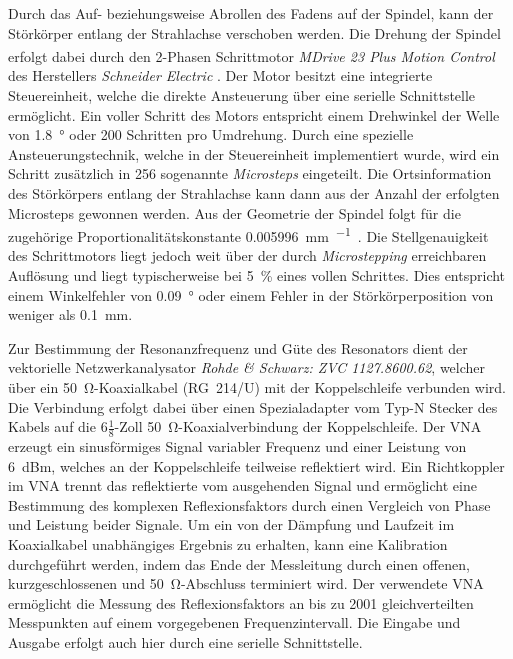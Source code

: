 Durch das Auf- beziehungsweise Abrollen des Fadens auf der Spindel, kann der Störkörper entlang der Strahlachse verschoben werden.
Die Drehung der Spindel erfolgt dabei durch den 2-Phasen Schrittmotor \textit{MDrive\textsuperscript{\textregistered} 23 Plus Motion Control} des Herstellers \textit{Schneider Electric} \cite{motor_datasheet}.
Der Motor besitzt eine integrierte Steuereinheit, welche die direkte Ansteuerung über eine serielle Schnittstelle ermöglicht.
Ein voller Schritt des Motors entspricht einem Drehwinkel der Welle von \SI{1.8}{\degree} oder \num{200} Schritten pro Umdrehung.
Durch eine spezielle Ansteuerungstechnik, welche in der Steuereinheit implementiert wurde, wird ein Schritt zusätzlich in \num{256} sogenannte \textit{Microsteps} eingeteilt.
Die Ortsinformation des Störkörpers entlang der Strahlachse kann dann aus der Anzahl der erfolgten Microsteps gewonnen werden.
Aus der Geometrie der Spindel folgt für die zugehörige Proportionalitätskonstante \SI{0.005996}{\milli\metre\per\micro\step}.
Die Stellgenauigkeit  des Schrittmotors liegt jedoch weit über der durch \textit{Microstepping} erreichbaren Auflösung und liegt typischerweise bei \SI{5}{\percent} eines vollen Schrittes.
Dies entspricht einem Winkelfehler von \SI{0.09}{\degree} oder einem Fehler in der Störkörperposition von weniger als \SI{0.1}{\milli\metre}.

Zur Bestimmung der Resonanzfrequenz und Güte des Resonators dient der vektorielle Netzwerkanalysator \textit{Rohde \& Schwarz: ZVC 1127.8600.62}, welcher über ein \SI{50}{\ohm}-Koaxialkabel (RG~214/U) mit der Koppelschleife verbunden wird.
Die Verbindung erfolgt dabei über einen Spezialadapter vom Typ-N Stecker des Kabels auf die $6\tfrac{1}{8}$-Zoll \SI{50}{\ohm}-Koaxialverbindung der Koppelschleife.
Der VNA erzeugt ein sinusförmiges Signal variabler Frequenz und einer Leistung von \SI{6}{dBm}, welches an der Koppelschleife teilweise reflektiert wird.
Ein Richtkoppler im VNA trennt das reflektierte vom ausgehenden Signal und ermöglicht eine Bestimmung des komplexen Reflexionsfaktors durch einen Vergleich von Phase und Leistung beider Signale.
Um ein von der Dämpfung und Laufzeit im Koaxialkabel unabhängiges Ergebnis zu erhalten, kann eine Kalibration durchgeführt werden, indem das Ende der Messleitung durch einen offenen, kurzgeschlossenen und \SI{50}{\ohm}-Abschluss terminiert wird.
Der verwendete VNA ermöglicht die Messung des Reflexionsfaktors an bis zu \num{2001} gleichverteilten Messpunkten auf einem vorgegebenen Frequenzintervall.
Die Eingabe und Ausgabe erfolgt auch hier durch eine serielle Schnittstelle.

